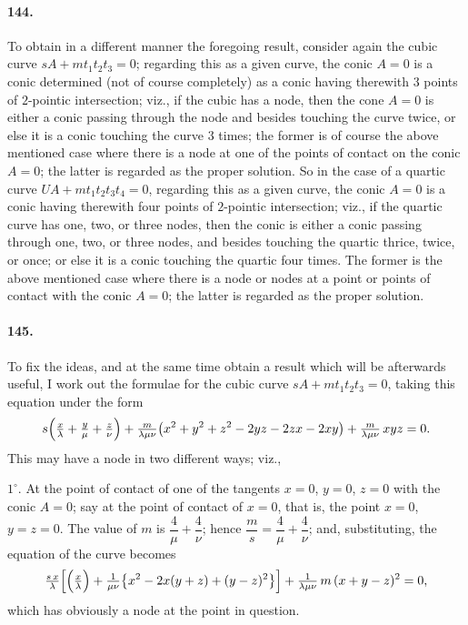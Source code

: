 \documentclass[11pt,a4paper]{article}
\begin{document}
\paragraph{144.}
To obtain in a different manner the foregoing result, consider again the
cubic curve $sA + m t_1 t_2 t_3 = 0$; regarding this as a given curve,
the conic $A = 0$ is a conic determined (not of course completely) as a
conic having therewith $3$ points of $2$-pointic intersection; viz., if
the cubic has a node, then the cone $A = 0$ is either a conic passing
through the node and besides touching the curve twice, or else it is a
conic touching the curve $3$ times; the former is of course the above
mentioned case where there is a node at one of the points of contact on
the conic $A = 0$; the latter is regarded as the proper solution. So in
the case of a quartic curve $UA + m t_1 t_2 t_3 t_4 = 0$, regarding this
as a given curve, the conic $A = 0$ is a conic having therewith four
points of $2$-pointic intersection; viz., if the quartic curve has one,
two, or three nodes, then the conic is either a conic passing through
one, two, or three nodes, and besides touching the quartic thrice, twice,
or once; or else it is a conic touching the quartic four times. The
former is the above mentioned case where there is a node or nodes at a
point or points of contact with the conic $A = 0$; the latter is regarded
as the proper solution.

\paragraph{145.}
To fix the ideas, and at the same time obtain a result which will be
afterwards useful, I work out the formulae for the cubic curve
$sA + m t_1 t_2 t_3 = 0$, taking this equation under the form
\[
s\Bigl(\tfrac{x}{\lambda} + \tfrac{y}{\mu} + \tfrac{z}{\nu}\Bigr)
+ \tfrac{m}{\lambda \mu \nu}\bigl(x^2 + y^2 + z^2 - 2yz - 2zx - 2xy\bigr)
+ \tfrac{m}{\lambda \mu \nu}\, xyz = 0.
\]
This may have a node in two different ways; viz.,

$1^\circ$. At the point of contact of one of the tangents $x = 0$, $y = 0$,
$z = 0$ with the conic $A = 0$; say at the point of contact of $x = 0$,
that is, the point $x = 0$, $y = z = 0$. The value of $m$ is
$\dfrac{4}{\mu} + \dfrac{4}{\nu}$; hence
$\dfrac{m}{s} = \dfrac{4}{\mu} + \dfrac{4}{\nu}$; and, substituting, the
equation of the curve becomes
\[
\tfrac{s\, x}{\lambda}\Bigl[\Bigl(\tfrac{x}{\lambda}\Bigr)
+ \tfrac{1}{\mu \nu}\bigl\{x^2 - 2x(y + z) + (y - z)^2\bigr\}\Bigr]
+ \tfrac{1}{\lambda \mu \nu}\, m\, (x + y - z)^2 = 0,
\]
which has obviously a node at the point in question.
\end{document}
